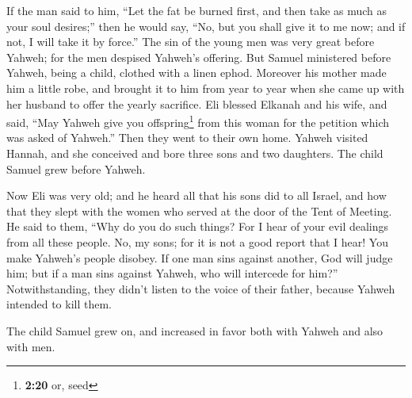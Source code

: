  If the man said to him, ``Let the fat be burned first,
and then take as much as your soul desires;'' then he would say, ``No,
but you shall give it to me now; and if not, I will take it by force.''
 The sin of the young men was very great before Yahweh;
for the men despised Yahweh's offering.  But Samuel
ministered before Yahweh, being a child, clothed with a linen ephod.
 Moreover his mother made him a little robe, and brought
it to him from year to year when she came up with her husband to offer
the yearly sacrifice.  Eli blessed Elkanah and his wife,
and said, ``May Yahweh give you offspring\footnote{\textbf{2:20} or,
  seed} from this woman for the petition which was asked of Yahweh.''
Then they went to their own home.  Yahweh visited Hannah,
and she conceived and bore three sons and two daughters. The child
Samuel grew before Yahweh.

 Now Eli was very old; and he heard all that his sons did
to all Israel, and how that they slept with the women who served at the
door of the Tent of Meeting.  He said to them, ``Why do
you do such things? For I hear of your evil dealings from all these
people.  No, my sons; for it is not a good report that I
hear! You make Yahweh's people disobey.  If one man sins
against another, God will judge him; but if a man sins against Yahweh,
who will intercede for him?'' Notwithstanding, they didn't listen to the
voice of their father, because Yahweh intended to kill them.

 The child Samuel grew on, and increased in favor both
with Yahweh and also with men.

